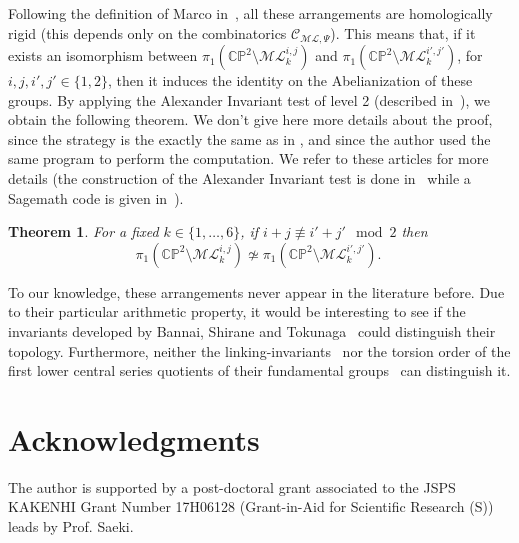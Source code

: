 \documentclass[11pt, a4paper]{amsart}
\newtheorem{theorem}{Theorem}[section]
\theoremstyle{definition}
\theoremstyle{remark}
\newcommand{\CC}{\mathds{C}}
\newcommand{\PP}{\mathds{P}}
\newcommand{\C}{\mathcal{C}}
\newcommand{\ML}{\mathcal{ML}}
\begin{document}
Following the definition of Marco in~\cite{Mar:pencils}, all these arrangements are homologically rigid (this depends only on the combinatorics $\C_{\ML,\Psi}$). This means that, if it exists an isomorphism between $\pi_1(\CC\PP^2\setminus \ML_k^{i,j})$ and  $\pi_1(\CC\PP^2\setminus \ML_k^{i',j'})$, for $i,j,i',j'\in\{1,2\}$, then it induces the identity on the Abelianization of these groups. By applying the Alexander Invariant test of level 2 (described in~\cite{ACCM:Rybnikov,ACGM:arithmetic}), we obtain the following theorem. We don't give here more details about the proof, since the strategy is the exactly the same as in \cite{ACCM:Rybnikov,ACGM:arithmetic,Gue:LLN}, and since the author used the same program to perform the computation. We refer to these articles for more details (the construction of the Alexander Invariant test is done in~\cite{ACCM:Rybnikov} while a Sagemath code is given in~\cite{ACGM:arithmetic}).
	
\begin{theorem}\label{thm:pi_1}
	For a fixed $k\in\{1,\dots,6\}$, if $ i+j \not\equiv i'+j' \mod 2$ then
	\begin{equation*}
		\pi_1(\CC\PP^2\setminus \ML_k^{i,j}) \not\simeq \pi_1(\CC\PP^2\setminus \ML_k^{i',j'}).
		\
	\end{equation*}
\end{theorem}

To our knowledge, these arrangements never appear in the literature before. Due to their particular arithmetic property, it would be interesting to see if the invariants developed by Bannai, Shirane and Tokunaga~\cite{Ban:splitting,Shi:splitting,Tok:elliptic} could distinguish their topology. Furthermore, neither the linking-invariants~\cite{AFG:invariant,Gue:LLN} nor the torsion order of the first lower central series quotients of their fundamental groups~\cite{Suc:enumerative,AGV:torsion} can distinguish it.
	


\section{Acknowledgments}

The author is supported by a post-doctoral grant associated to the JSPS KAKENHI Grant Number 17H06128 (Grant-in-Aid for Scientific Research (S)) leads by Prof. Saeki.
	
	
	



\end{document}
